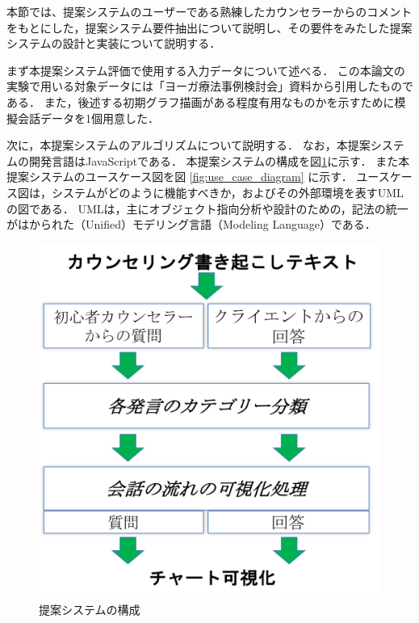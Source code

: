 \documentclass[shuuron]{kuee}
\begin{document}
本節では、提案システムのユーザーである熟練したカウンセラーからのコメントをもとにした，提案システム要件抽出について説明し、その要件をみたした提案システムの設計と実装について説明する．

まず本提案システム評価で使用する入力データについて述べる．
この本論文の実験で用いる対象データには「ヨーガ療法事例検討会」資料から引用したものである．
また，後述する初期グラフ描画がある程度有用なものかを示すために模擬会話データを1個用意した．

次に，本提案システムのアルゴリズムについて説明する．
なお，本提案システムの開発言語はJavaScriptである．
本提案システムの構成を図\ref{fig:4_2}に示す．
また本提案システムのユースケース図を図
\ref{fig:use_case_diagram}
に示す．
ユースケース図は，システムがどのように機能すべきか，およびその外部環境を表すUMLの図である．
UMLは，主にオブジェクト指向分析や設計のための，記法の統一がはかられた（Unified）モデリング言語（Modeling Language）である．


\begin{figure}
  \begin{center}
    \includegraphics[width=\linewidth]{4_2.png}
  \end{center}
  \caption{提案システムの構成}
  \label{fig:4_2}
\end{figure}
\end{document}
